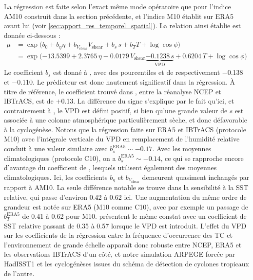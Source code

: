 \documentclass[../main.tex]{subfiles}
\begin{document}
La régression est faite selon l'exact même mode opératoire que pour l'indice AM10 construit dans la section précédente, et l'indice M10 établit sur ERA5 avant
lui (voir \cref{sec:apport_res_temporel_spatial}). La relation ainsi établie est donnée ci-dessous :
%
\begin{align*}
    \mu &= \exp \big( b_0 + b_\eta \eta + b_{V_{\mathrm{shear}}} V_{\mathrm{shear}} + b_{s} \, s + b_T T + \log \cos \phi \big)\\
        &= \exp \big( \num{-13.5399} + \num{2.3765} \, \eta - \num{0.0179} \, V_{\mathrm{shear}} \underbrace{- \num{0.1238} \, s}_{\mathrm{VPD}} + \num{0.6204} \, T + \log \cos \phi \big)
\end{align*}
%
Le coefficient $b_s$ est donné à , avec des pourcentiles  et  de respectivement \num{-0.138} et \num{-0.110}. Le
prédicteur est donc hautement significatif dans la régression. À titre de référence, le coefficient trouvé dans \textcite{camargo_testing_2014}, entre la
réanalyse NCEP et IBTrACS, est de $+$\num{0.13}. La différence du signe s'explique par le fait qu'ici, et contrairement à \textcite{camargo_testing_2014}, le
VPD est défini positif, si bien qu'une grande valeur de $s$ est associée à une colonne atmosphérique particulièrement sèche, et donc défavorable à la
cyclogénèse. Notons que la régression faite sur ERA5 et IBTrACS (protocole M10) avec l'intégrale verticale du VPD en remplacement de l'humidité relative conduit
à une valeur similaire avec $b_s^{\mathrm{ERA5}} \sim \num{-0.17}$. Avec les moyennes climatologiques (protocole C10), on a $b_s^{\mathrm{ERA5}} \sim
\num{-0.14}$, ce qui se rapproche encore d'avantage du coefficient de \textcite{camargo_testing_2014}, lesquels utilisent également des moyennes
climatologiques. Ici, les coefficients $b_\eta$ et $b_{V_{\mathrm{shear}}}$ demeurent quasiment inchangés par rapport à AM10. La seule différence notable se
trouve dans la sensibilité à la SST relative, qui passe d'environ \num{0.42} à \num{0.62} ici. Une augmentation du même ordre de grandeur est notée sur ERA5
(M10 comme C10), avec par exemple un passage de $b_T^{\mathrm{ERA5}}$ de \num{0.41} à \num{0.62} pour M10. \textcite{camargo_testing_2014} présentent le même
constat avec un coefficient de SST relative passant de \num{0.35} à \num{0.57} lorsque le VPD est introduit. L'effet du VPD sur les coefficients de la
régression entre la fréquence d'occurrence des TC et l'environnement de grande échelle apparaît donc robuste entre NCEP, ERA5 et les observations IBTrACS d'un
côté, et notre simulation ARPEGE forcée par HadISST1 et les cyclogénèses issues du schéma de détection de cyclones tropicaux de l'autre.
\end{document}
